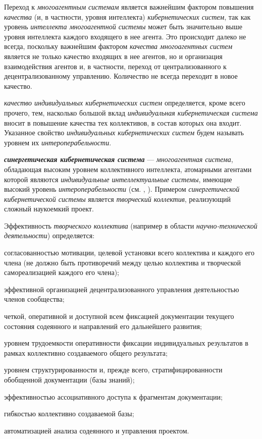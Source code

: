 {\label{sec_mas_overall_quality}} 

Переход к \textit{многоагентным системам} является важнейшим фактором повышения \textit{качества} (и, в частности, уровня интеллекта) \textit{кибернетических систем}, так как уровень \textit{интеллекта многоагентной системы} может быть значительно выше уровня интеллекта каждого входящего в нее агента. 
Это происходит далеко не всегда, поскольку важнейшим фактором \textit{качества многоагентных систем} является не только качество входящих в нее агентов, но и организация взаимодействия агентов и, в частности, переход от централизованного к децентрализованному управлению. 
Количество не всегда переходит в новое качество.

\textit{качество индивидуальных кибернетических систем} определяется, кроме всего прочего, тем, насколько большой вклад \textit{индивидуальная кибернетическая система} вносит в повышение качества тех коллективов, в состав которых она входит.
Указанное свойство \textit{индивидуальных кибернетических систем} будем называть уровнем их \textit{интероперабельности}.

\textbf{\textit{синергетическая кибернетическая система}} --- \textit{многоагентная система}, обладающая высоким уровнем коллективного интеллекта, атомарными агентами которой являются \textit{индивидуальные интеллектуальные системы}, имеющие высокий уровень \textit{интероперабельности} (см. , ).
Примером \textit{синергетической кибернетической системы} является \textit{творческий коллектив}, реализующий сложный наукоемкий проект.

Эффективность \textit{творческого коллектива} (например в области \textit{научно-технической деятельности}) определяется:
\begin{textitemize}
    \item согласованностью мотивации, целевой установки всего коллектива и каждого его члена (не должно быть противоречий между целью коллектива и творческой самореализацией каждого его члена);
    \item эффективной организацией децентрализованного управления деятельностью членов сообщества;
    \item четкой, оперативной и доступной всем фиксацией документации текущего состояния содеянного и направлений его дальнейшего развития;
    \item уровнем трудоемкости оперативности фиксации индивидуальных результатов в рамках коллективно создаваемого общего результата;
    \item уровнем структурированности и, прежде всего, стратифицированности обобщенной документации (базы знаний);
    \item эффективностью ассоциативного доступа к фрагментам документации;
    \item гибкостью коллективно создаваемой базы;
    \item автоматизацией анализа содеянного и управления проектом.
\end{textitemize}

